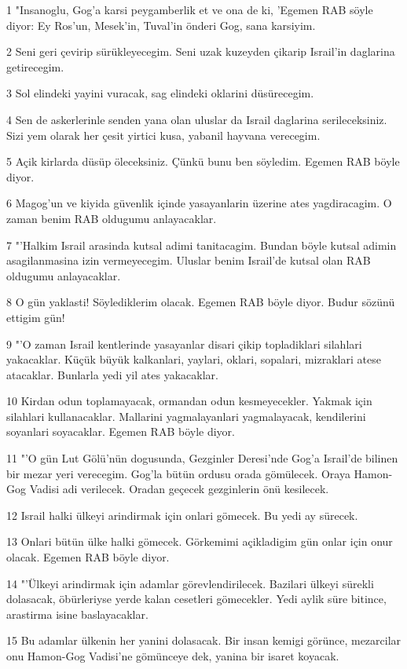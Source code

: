 \par 1 "Insanoglu, Gog'a karsi peygamberlik et ve ona de ki, 'Egemen RAB söyle diyor: Ey Ros'un, Mesek'in, Tuval'in önderi Gog, sana karsiyim.
\par 2 Seni geri çevirip sürükleyecegim. Seni uzak kuzeyden çikarip Israil'in daglarina getirecegim.
\par 3 Sol elindeki yayini vuracak, sag elindeki oklarini düsürecegim.
\par 4 Sen de askerlerinle senden yana olan uluslar da Israil daglarina serileceksiniz. Sizi yem olarak her çesit yirtici kusa, yabanil hayvana verecegim.
\par 5 Açik kirlarda düsüp öleceksiniz. Çünkü bunu ben söyledim. Egemen RAB böyle diyor.
\par 6 Magog'un ve kiyida güvenlik içinde yasayanlarin üzerine ates yagdiracagim. O zaman benim RAB oldugumu anlayacaklar.
\par 7 "'Halkim Israil arasinda kutsal adimi tanitacagim. Bundan böyle kutsal adimin asagilanmasina izin vermeyecegim. Uluslar benim Israil'de kutsal olan RAB oldugumu anlayacaklar.
\par 8 O gün yaklasti! Söylediklerim olacak. Egemen RAB böyle diyor. Budur sözünü ettigim gün!
\par 9 "'O zaman Israil kentlerinde yasayanlar disari çikip topladiklari silahlari yakacaklar. Küçük büyük kalkanlari, yaylari, oklari, sopalari, mizraklari atese atacaklar. Bunlarla yedi yil ates yakacaklar.
\par 10 Kirdan odun toplamayacak, ormandan odun kesmeyecekler. Yakmak için silahlari kullanacaklar. Mallarini yagmalayanlari yagmalayacak, kendilerini soyanlari soyacaklar. Egemen RAB böyle diyor.
\par 11 "'O gün Lut Gölü'nün dogusunda, Gezginler Deresi'nde Gog'a Israil'de bilinen bir mezar yeri verecegim. Gog'la bütün ordusu orada gömülecek. Oraya Hamon-Gog Vadisi adi verilecek. Oradan geçecek gezginlerin önü kesilecek.
\par 12 Israil halki ülkeyi arindirmak için onlari gömecek. Bu yedi ay sürecek.
\par 13 Onlari bütün ülke halki gömecek. Görkemimi açikladigim gün onlar için onur olacak. Egemen RAB böyle diyor.
\par 14 "'Ülkeyi arindirmak için adamlar görevlendirilecek. Bazilari ülkeyi sürekli dolasacak, öbürleriyse yerde kalan cesetleri gömecekler. Yedi aylik süre bitince, arastirma isine baslayacaklar.
\par 15 Bu adamlar ülkenin her yanini dolasacak. Bir insan kemigi görünce, mezarcilar onu Hamon-Gog Vadisi'ne gömünceye dek, yanina bir isaret koyacak.
